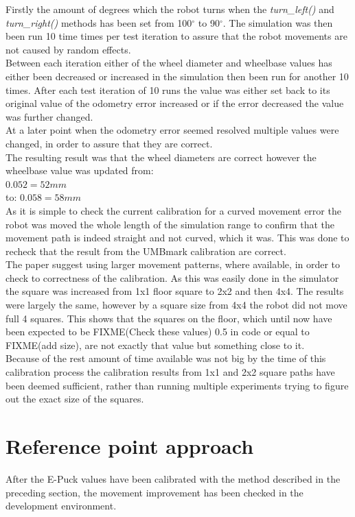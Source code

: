 Firstly the amount of degrees which the robot turns when the \textit{turn\_left()} and \textit{turn\_right()} methods has been set from 100$^{\circ}$ to 90$^{\circ}$. The simulation was then been run 10 time times per test iteration to assure that the robot movements are not caused by random effects.\\
Between each iteration either of the wheel diameter and wheelbase values has either been decreased or increased in the simulation then been run for another 10 times. After each test iteration of 10 runs the value was either set back to its original value of the odometry error increased or if the error decreased the value was further changed. \\
At a later point when the odometry error seemed resolved multiple values were changed, in order to assure that they are correct. \\
The resulting result was that the wheel diameters are correct however the wheelbase value was updated from:\\
$0.052 = 52mm$\\
to:
$0.058 = 58mm$\\
As it is simple to check the current calibration for a curved movement error the robot was moved the whole length of the simulation range to confirm that the movement path is indeed straight and not curved, which it was. This was done to recheck that the result from the UMBmark calibration are correct. \\[3ex]

The paper suggest using larger movement patterns, where available, in order to check to correctness of the calibration. As this was easily done in the simulator the square was increased from 1x1 floor square to 2x2 and then 4x4. The results were largely the same, however by a square size from 4x4 the robot did not move full 4 squares. This shows that the squares on the floor, which until now have been expected to be FIXME(Check these values) 0.5 in code or equal to FIXME(add size), are not exactly that value but something close to it. \\
Because of the rest amount of time available was not big by the time of this calibration process the calibration results from 1x1 and 2x2 square paths have been deemed sufficient, rather than running multiple experiments trying to figure out the exact size of the squares. \\

\section{Reference point approach}
After the E-Puck values have been calibrated with the method described in the preceding section, the movement improvement has been checked in the development environment. \\

